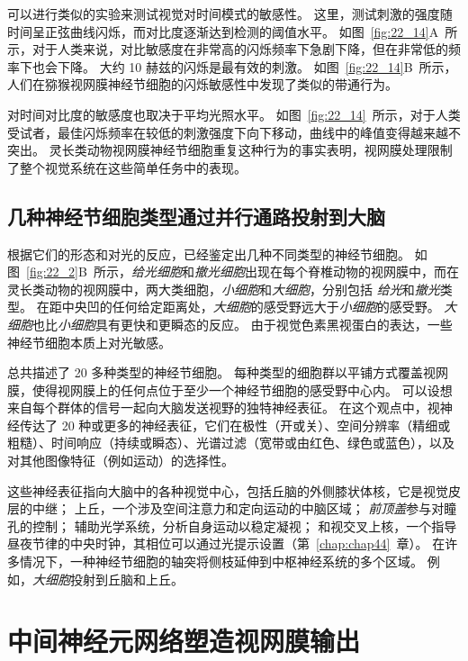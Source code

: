 \begin{proposition}[人类感知的时空敏感性]
	\quad \quad 可以进行类似的实验来测试视觉对时间模式的敏感性。
	这里，测试刺激的强度随时间呈正弦曲线闪烁，而对比度逐渐达到检测的阈值水平。
	如图~\ref{fig:22_14}A~所示，对于人类来说，对比敏感度在非常高的闪烁频率下急剧下降，但在非常低的频率下也会下降。
	大约 10 赫兹的闪烁是最有效的刺激。
	如图~\ref{fig:22_14}B~所示，人们在猕猴视网膜神经节细胞的闪烁敏感性中发现了类似的带通行为。
	
	\quad \quad 对时间对比度的敏感度也取决于平均光照水平。
	如图~\ref{fig:22_14}~所示，对于人类受试者，最佳闪烁频率在较低的刺激强度下向下移动，曲线中的峰值变得越来越不突出。
	灵长类动物视网膜神经节细胞重复这种行为的事实表明，视网膜处理限制了整个视觉系统在这些简单任务中的表现。
	
\end{proposition}



\subsection{几种神经节细胞类型通过并行通路投射到大脑}

根据它们的形态和对光的反应，已经鉴定出几种不同类型的神经节细胞。
如图~\ref{fig:22_2}B~所示，\textit{给光细胞}和\textit{撤光细胞}出现在每个脊椎动物的视网膜中，而在灵长类动物的视网膜中，两大类细胞，\textit{小细胞}和\textit{大细胞}，分别包括 \textit{给光}和\textit{撤光}类型。
在距中央凹的任何给定距离处，\textit{大细胞}的感受野远大于\textit{小细胞}的感受野。
\textit{大细胞}也比\textit{小细胞}具有更快和更瞬态的反应。
由于视觉色素黑视蛋白的表达，一些神经节细胞本质上对光敏感。


总共描述了 20 多种类型的神经节细胞。
每种类型的细胞群以平铺方式覆盖视网膜，使得视网膜上的任何点位于至少一个神经节细胞的感受野中心内。
可以设想来自每个群体的信号一起向大脑发送视野的独特神经表征。
在这个观点中，视神经传达了 20 种或更多的神经表征，它们在极性（开或关）、空间分辨率（精细或粗糙）、时间响应（持续或瞬态）、光谱过滤（宽带或由红色、绿色或蓝色），以及对其他图像特征（例如运动）的选择性。


这些神经表征指向大脑中的各种视觉中心，包括丘脑的外侧膝状体核，它是视觉皮层的中继；
上丘，一个涉及空间注意力和定向运动的中脑区域；
\textit{前顶盖}参与对瞳孔的控制； 
辅助光学系统，分析自身运动以稳定凝视；
和视交叉上核，一个指导昼夜节律的中央时钟，其相位可以通过光提示设置（第~\ref{chap:chap44}~章）。 
在许多情况下，一种神经节细胞的轴突将侧枝延伸到中枢神经系统的多个区域。
例如，\textit{大细胞}投射到丘脑和上丘。



\section{中间神经元网络塑造视网膜输出}

